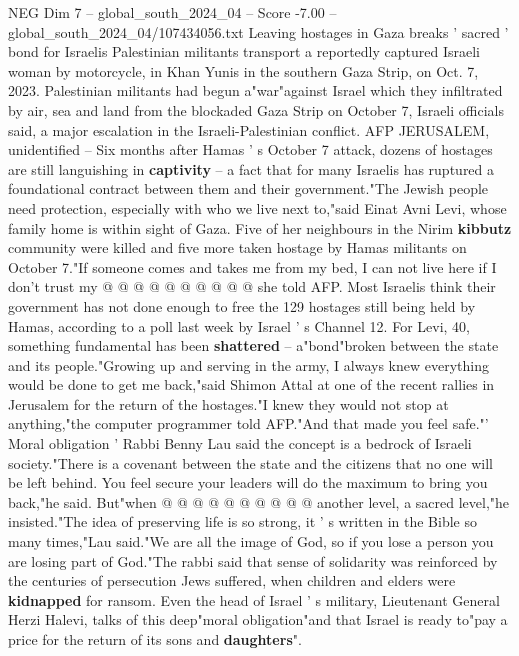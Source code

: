 \begin{textsample}{NEG Dim 7 – global\_south\_2024\_04 – Score -7.00 – global\_south\_2024\_04/107434056.txt}  \label{ex:f7_neg_343}
Leaving hostages in Gaza breaks ' sacred ' bond for Israelis Palestinian militants transport a reportedly captured Israeli woman by motorcycle, in Khan Yunis in the southern Gaza Strip, on Oct. 7, 2023.
Palestinian militants had begun a"war"against Israel which they infiltrated by air, sea and land from the blockaded Gaza Strip on October 7, Israeli officials said, a major escalation in the Israeli-Palestinian conflict.
AFP JERUSALEM, unidentified -- Six months after Hamas ' s October 7 attack, dozens of hostages are still languishing in \textbf{captivity} -- a fact that for many Israelis has ruptured a foundational contract between them and their government."The Jewish people need protection, especially with who we live next to,"said Einat Avni Levi, whose family home is within sight of Gaza.
Five of her neighbours in the Nirim \textbf{kibbutz} community were killed and five more taken hostage by Hamas militants on October 7."If someone comes and takes me from my bed, I can not live here if I don't trust my @ @ @ @ @ @ @ @ @ @ she told AFP.
Most Israelis think their government has not done enough to free the 129 hostages still being held by Hamas, according to a poll last week by Israel ' s Channel 12.
For Levi, 40, something fundamental has been \textbf{shattered} -- a"bond"broken between the state and its people."Growing up and serving in the army, I always knew everything would be done to get me back,"said Shimon Attal at one of the recent rallies in Jerusalem for the return of the hostages."I knew they would not stop at anything,"the computer programmer told AFP."And that made you feel safe."' Moral obligation ' Rabbi Benny Lau said the concept is a bedrock of Israeli society."There is a covenant between the state and the citizens that no one will be left behind.
You feel secure your leaders will do the maximum to bring you back,"he said.
But"when @ @ @ @ @ @ @ @ @ @ another level, a sacred level,"he insisted."The idea of preserving life is so strong, it ' s written in the Bible so many times,"Lau said."We are all the image of God, so if you lose a person you are losing part of God."The rabbi said that sense of solidarity was reinforced by the centuries of persecution Jews suffered, when children and elders were \textbf{kidnapped} for ransom.
Even the head of Israel ' s military, Lieutenant General Herzi Halevi, talks of this deep"moral obligation"and that Israel is ready to"pay a price for the return of its sons and \textbf{daughters}".

\end{textsample}

